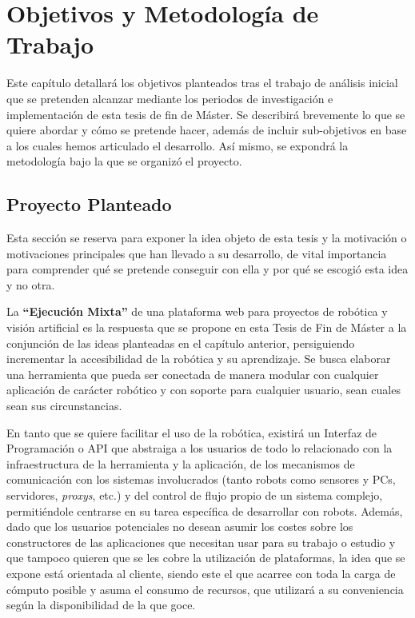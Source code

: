 \chapter{Objetivos y Metodología de Trabajo}

Este capítulo detallará los objetivos planteados tras el trabajo de análisis inicial que se pretenden alcanzar mediante los periodos de investigación e implementación de esta tesis de fin de Máster. Se describirá brevemente lo que se quiere abordar y cómo se pretende hacer, además de incluir sub-objetivos en base a los cuales hemos articulado el desarrollo. Así mismo, se expondrá la metodología bajo la que se organizó el proyecto.

\section{Proyecto Planteado}

Esta sección se reserva para exponer la idea objeto de esta tesis y la motivación o motivaciones principales que han llevado a su desarrollo, de vital importancia para comprender qué se pretende conseguir con ella y por qué se escogió esta idea y no otra.

La \textbf{``Ejecución Mixta''} de una plataforma web para proyectos de robótica y visión artificial es la respuesta que se propone en esta Tesis de Fin de Máster a la conjunción de las ideas planteadas en el capítulo anterior, persiguiendo incrementar la accesibilidad de la robótica y su aprendizaje. Se busca elaborar una herramienta que pueda ser conectada de manera modular con cualquier aplicación de carácter robótico y con soporte para cualquier usuario, sean cuales sean sus circunstancias.

En tanto que se quiere facilitar el uso de la robótica, existirá un Interfaz de Programación o API que abstraiga a los usuarios de todo lo relacionado con la infraestructura de la herramienta y la aplicación, de los mecanismos de comunicación con los sistemas involucrados (tanto robots como sensores y PCs, servidores, \textit{proxys}, etc.) y del control de flujo propio de un sistema complejo, permitiéndole centrarse en su tarea específica de desarrollar con robots. Además, dado que los usuarios potenciales no desean asumir los costes sobre los constructores de las aplicaciones que necesitan usar para su trabajo o estudio y que tampoco quieren que se les cobre la utilización de plataformas, la idea que se expone está orientada al cliente, siendo este el que acarree con toda la carga de cómputo posible y asuma el consumo de recursos, que utilizará a su conveniencia según la disponibilidad de la que goce.

